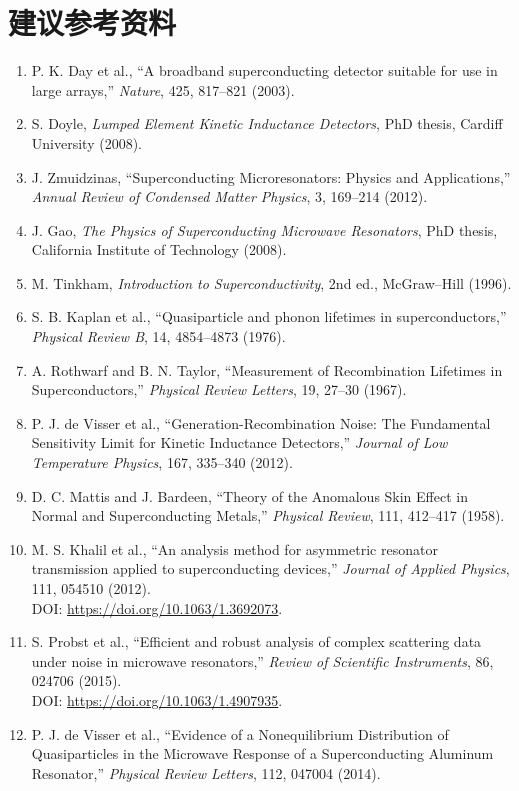 \documentclass[11pt,a4paper,openany]{ctexrep}
\begin{document}
\chapter*{建议参考资料}
\begin{enumerate}
  \item P. K. Day et al., ``A broadband superconducting detector suitable for use in large arrays,'' \textit{Nature}, 425, 817--821 (2003).
  \item S. Doyle, \textit{Lumped Element Kinetic Inductance Detectors}, PhD thesis, Cardiff University (2008).
  \item J. Zmuidzinas, ``Superconducting Microresonators: Physics and Applications,'' \textit{Annual Review of Condensed Matter Physics}, 3, 169--214 (2012).
  \item J. Gao, \textit{The Physics of Superconducting Microwave Resonators}, PhD thesis, California Institute of Technology (2008).
  \item M. Tinkham, \textit{Introduction to Superconductivity}, 2nd ed., McGraw--Hill (1996).
  \item S. B. Kaplan et al., ``Quasiparticle and phonon lifetimes in superconductors,'' \textit{Physical Review B}, 14, 4854--4873 (1976).
  \item A. Rothwarf and B. N. Taylor, ``Measurement of Recombination Lifetimes in Superconductors,'' \textit{Physical Review Letters}, 19, 27--30 (1967).
  \item P. J. de Visser et al., ``Generation-Recombination Noise: The Fundamental Sensitivity Limit for Kinetic Inductance Detectors,'' \textit{Journal of Low Temperature Physics}, 167, 335--340 (2012).
  \item D. C. Mattis and J. Bardeen, ``Theory of the Anomalous Skin Effect in Normal and Superconducting Metals,'' \textit{Physical Review}, 111, 412--417 (1958).
  \item M. S. Khalil et al., ``An analysis method for asymmetric resonator transmission applied to superconducting devices,'' \textit{Journal of Applied Physics}, 111, 054510 (2012).\\ DOI: \url{https://doi.org/10.1063/1.3692073}.
  \item S. Probst et al., ``Efficient and robust analysis of complex scattering data under noise in microwave resonators,'' \textit{Review of Scientific Instruments}, 86, 024706 (2015).\\ DOI: \url{https://doi.org/10.1063/1.4907935}.
  \item P. J. de Visser et al., ``Evidence of a Nonequilibrium Distribution of Quasiparticles in the Microwave Response of a Superconducting Aluminum Resonator,'' \textit{Physical Review Letters}, 112, 047004 (2014).

\end{enumerate}
\end{document}
